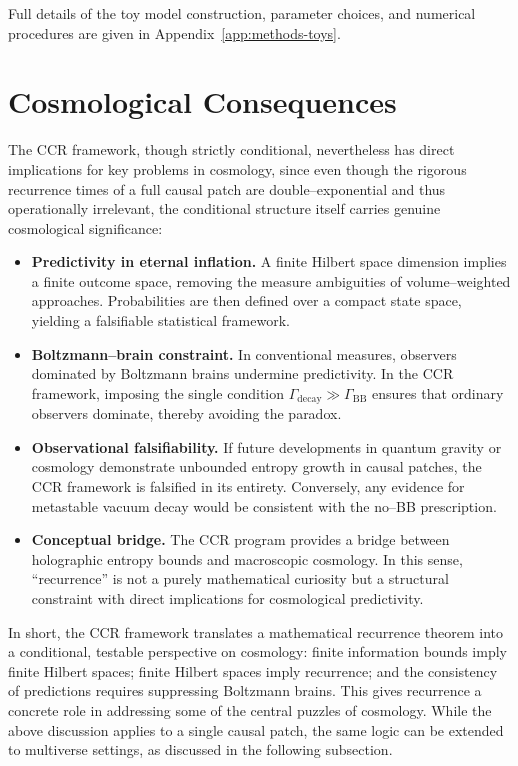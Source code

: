 \documentclass[12pt]{article}
\theoremstyle{remark}
\begin{document}
Full details of the toy model construction, parameter choices, and numerical procedures are given in Appendix~\ref{app:methods-toys}.



\section{Cosmological Consequences}

The CCR framework, though strictly conditional, nevertheless has direct implications 
for key problems in cosmology, since even though the rigorous recurrence times of a 
full causal patch are double–exponential and thus operationally irrelevant, the 
conditional structure itself carries genuine cosmological significance:

\begin{itemize}
    \item \textbf{Predictivity in eternal inflation.} 
    A finite Hilbert space dimension implies a finite outcome space, removing the 
    measure ambiguities of volume--weighted approaches. Probabilities are then defined 
    over a compact state space, yielding a falsifiable statistical framework.

    \item \textbf{Boltzmann--brain constraint.} 
    In conventional measures, observers dominated by Boltzmann brains undermine 
    predictivity. In the CCR framework, imposing the single condition 
    $\Gamma_{\text{decay}} \gg \Gamma_{\text{BB}}$ ensures that ordinary observers 
    dominate, thereby avoiding the paradox.

    \item \textbf{Observational falsifiability.} 
    If future developments in quantum gravity or cosmology demonstrate unbounded 
    entropy growth in causal patches, the CCR framework is falsified in its entirety. 
    Conversely, any evidence for metastable vacuum decay would be consistent with the 
    no--BB prescription.

    \item \textbf{Conceptual bridge.} 
    The CCR program provides a bridge between holographic entropy bounds and 
    macroscopic cosmology. In this sense, ``recurrence'' is not a purely mathematical 
    curiosity but a structural constraint with direct implications for cosmological 
    predictivity.
\end{itemize}

In short, the CCR framework translates a mathematical recurrence theorem into a 
conditional, testable perspective on cosmology: finite information bounds imply 
finite Hilbert spaces; finite Hilbert spaces imply recurrence; and the consistency 
of predictions requires suppressing Boltzmann brains. This gives recurrence a 
concrete role in addressing some of the central puzzles of cosmology. While the 
above discussion applies to a single causal patch, the same logic can be extended 
to multiverse settings, as discussed in the following subsection.
\end{document}
